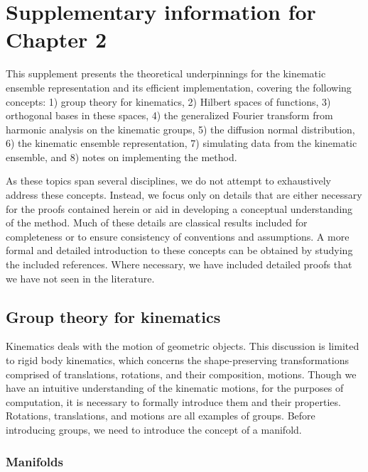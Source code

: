 \documentclass[../../main.tex]{subfiles}
\begin{document}
\chapter{Supplementary information for Chapter 2}
\label{ensemble-inference-si}

\begin{refsection}

	This supplement presents the theoretical underpinnings for the kinematic ensemble representation and its efficient implementation, covering the following concepts:
	1) group theory for kinematics,
	2) Hilbert spaces of functions,
	3) orthogonal bases in these spaces,
	4) the generalized Fourier transform from harmonic analysis on the kinematic groups,
	5) the diffusion normal distribution,
	6) the kinematic ensemble representation,
	7) simulating data from the kinematic ensemble, and
	8) notes on implementing the method.

	As these topics span several disciplines, we do not attempt to exhaustively address these concepts.
	Instead, we focus only on details that are either necessary for the proofs contained herein or aid in developing a conceptual understanding of the method.
	Much of these details are classical results included for completeness or to ensure consistency of conventions and assumptions.
	A more formal and detailed introduction to these concepts can be obtained by studying the included references.
	Where necessary, we have included detailed proofs that we have not seen in the literature.

	\section{Group theory for kinematics}\label{manifolds}

	Kinematics deals with the motion of geometric objects.
	This discussion is limited to rigid body kinematics, which concerns the shape-preserving transformations comprised of translations, rotations, and their composition, motions.
	Though we have an intuitive understanding of the kinematic motions, for the purposes of computation, it is necessary to formally introduce them and their properties.
	Rotations, translations, and motions are all examples of groups.
	Before introducing groups, we need to introduce the concept of a manifold.

	\subsection{Manifolds}\label{manifolds}


\end{refsection}
\end{document}
